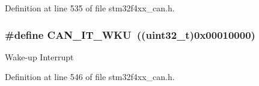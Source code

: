 Definition at line 535 of file stm32f4xx\-\_\-can.\-h.

\hypertarget{group___c_a_n__interrupts_gac9c8767770d94de753dda9ad31f9af15}{
\subsubsection[{C\-A\-N\-\_\-\-I\-T\-\_\-\-W\-K\-U}]{\setlength{\rightskip}{0pt plus 5cm}\#define C\-A\-N\-\_\-\-I\-T\-\_\-\-W\-K\-U~((uint32\-\_\-t)0x00010000)}}\label{group___c_a_n__interrupts_gac9c8767770d94de753dda9ad31f9af15}
Wake-\/up Interrupt 

Definition at line 546 of file stm32f4xx\-\_\-can.\-h.

